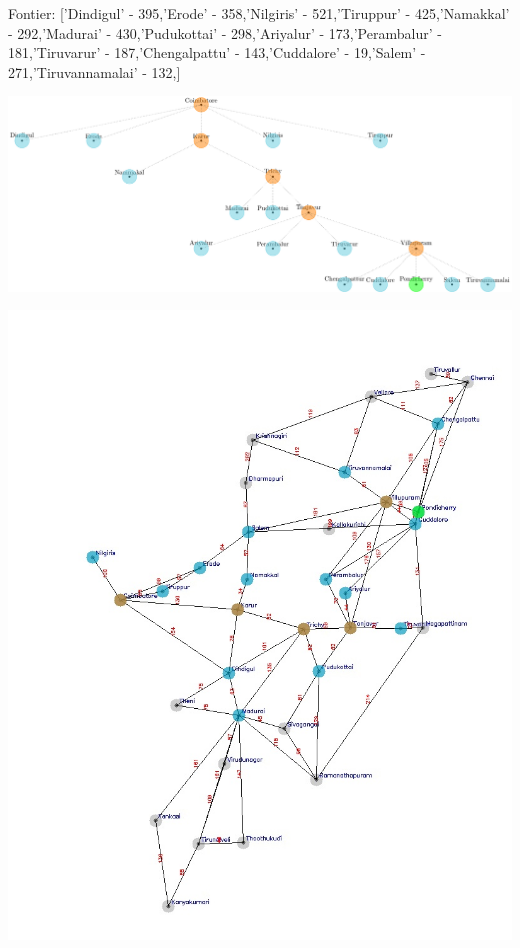 \documentclass[xcolor=table]{beamer}
\begin{document}
\begin{frame}
  { \tiny Fontier: ['Dindigul' - 395,'Erode' - 358,'Nilgiris' - 521,'Tiruppur' - 425,'Namakkal' - 292,'Madurai' - 430,'Pudukottai' - 298,'Ariyalur' - 173,'Perambalur' - 181,'Tiruvarur' - 187,'Chengalpattu' - 143,'Cuddalore' - 19,'Salem' - 271,'Tiruvannamalai' - 132,]}
  \begin{center}
  \includegraphics[height=0.35\textheight]{../GreedyNode/8-1.png}
  \end{center}
  \begin{center}
    \includegraphics[height=0.55\textheight]{../Greedyoutput/tamilGreedy6.jpg}
  \end{center}
\end{frame}
\end{document}
